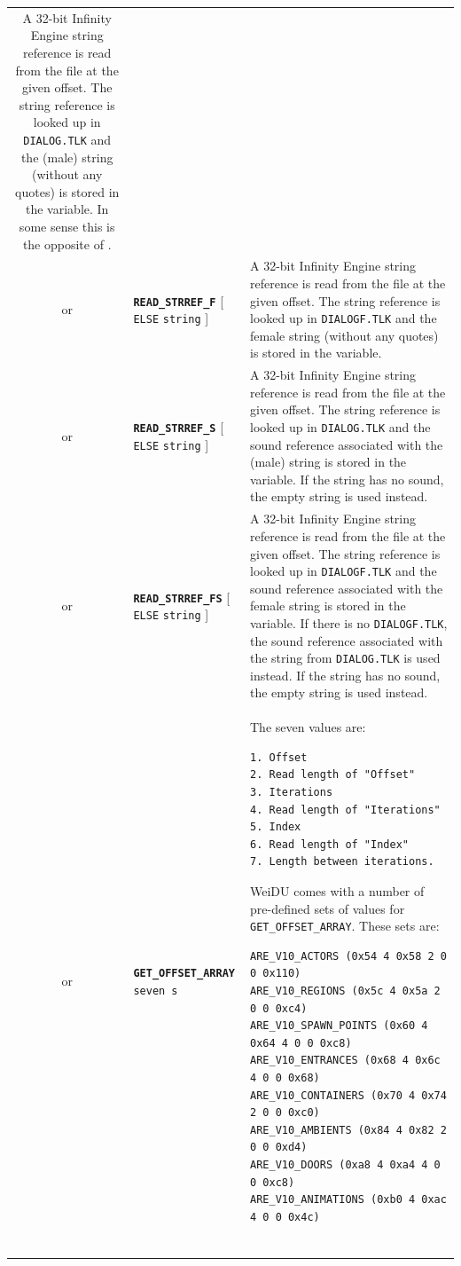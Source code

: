 \documentclass{article}
\def\ttref#1{\ahrefloc{#1}{\tt #1}}
\def\DEFINE#1{{\tt \bf #1}\label{#1}\index{#1}}
\def\t#1{{\tt #1}}
\def\Ob{{\color{red} [ }}
\def\Oe{{\color{red} ] }}
\begin{document}
\begin{tabular}{cp{10in}|p{10in}}
  A 32-bit Infinity Engine string reference is read from the
  file at the given offset. The string reference is looked up in
  \t{DIALOG.TLK} and the (male) string (without any quotes) is
  stored in the variable. In some sense this is the opposite of
  \ttref{SAY_EVALUATED}. \\

or & \DEFINE{READ_STRREF_F} \ttref{offset} \ttref{variable} \Ob \t{ELSE} \t{string} \Oe &

  A 32-bit Infinity Engine string reference is read from the file at
  the given offset. The string reference is looked up in
  \t{DIALOGF.TLK} and the female string (without any quotes) is stored
  in the variable. \\

or & \DEFINE{READ_STRREF_S} \ttref{offset} \ttref{variable} \Ob \t{ELSE} \t{string} \Oe &

  A 32-bit Infinity Engine string reference is read from the file at
  the given offset. The string reference is looked up in
  \t{DIALOG.TLK} and the sound reference associated with the (male)
  string is stored in the variable. If the string has no sound, the
  empty string is used instead. \\

or & \DEFINE{READ_STRREF_FS} \ttref{offset} \ttref{variable} \Ob \t{ELSE} \t{string} \Oe &

  A 32-bit Infinity Engine string reference is read from the file at
  the given offset. The string reference is looked up in
  \t{DIALOGF.TLK} and the sound reference associated with the female
  string is stored in the variable. If there is no \t{DIALOGF.TLK},
  the sound reference associated with the string from \t{DIALOG.TLK}
  is used instead. If the string has no sound, the empty string is
  used instead. \\

or & \DEFINE{GET_OFFSET_ARRAY} \ttref{String} \t{seven \ttref{value}s} &
  The seven values are:
\begin{verbatim}
1. Offset
2. Read length of "Offset"
3. Iterations
4. Read length of "Iterations"
5. Index
6. Read length of "Index"
7. Length between iterations.
\end{verbatim}

WeiDU comes with a number of pre-defined sets of values for \t{GET_OFFSET_ARRAY}. These sets are:
\begin{verbatim}
ARE_V10_ACTORS (0x54 4 0x58 2 0 0 0x110)
ARE_V10_REGIONS (0x5c 4 0x5a 2 0 0 0xc4)
ARE_V10_SPAWN_POINTS (0x60 4 0x64 4 0 0 0xc8)
ARE_V10_ENTRANCES (0x68 4 0x6c 4 0 0 0x68)
ARE_V10_CONTAINERS (0x70 4 0x74 2 0 0 0xc0)
ARE_V10_AMBIENTS (0x84 4 0x82 2 0 0 0xd4)
ARE_V10_DOORS (0xa8 4 0xa4 4 0 0 0xc8)
ARE_V10_ANIMATIONS (0xb0 4 0xac 4 0 0 0x4c)


\end{verbatim}
\end{tabular}
\end{document}
